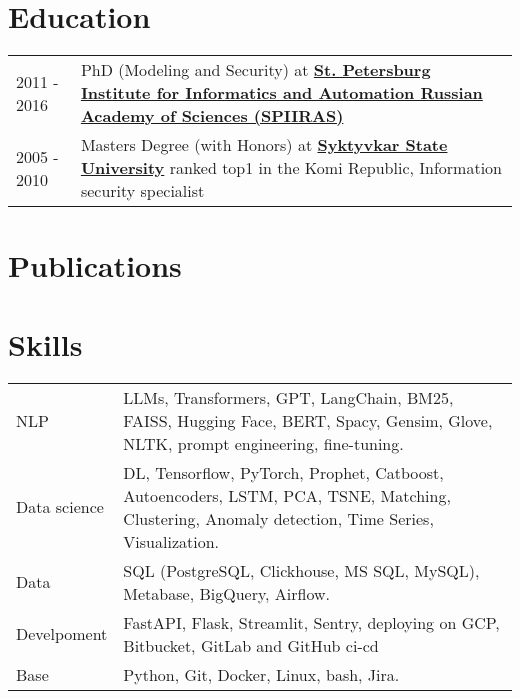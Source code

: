 \documentclass[a4paper,12pt]{article}
\begin{document}
\section{Education}
\begin{tabularx}{\linewidth}{@{}l X@{}}
2011 - 2016 & PhD (Modeling and Security) at \textbf{\href{http://www.spiiras.nw.ru/en/}{St. Petersburg Institute for Informatics and Automation Russian Academy of Sciences (SPIIRAS)}} \\

2005 - 2010 & Masters Degree (with Honors) at \textbf{\href{https://en.syktsu.ru/}{Syktyvkar State University}} ranked top1 in the Komi Republic, Information security specialist \hfill  \\
\end{tabularx}

\section{Publications}

\begin{refsection}
\nocite{nosal2011modeling, nosal2013justification}
\printbibliography[heading=none]
\end{refsection}


\section{Skills}
\begin{tabularx}{\linewidth}{@{}l X@{}}
NLP &  \normalsize{LLMs, Transformers, GPT, LangChain, BM25, FAISS, Hugging Face, BERT, Spacy, Gensim, Glove, NLTK, prompt engineering, fine-tuning.}\\
Data science  &  \normalsize{DL, Tensorflow, PyTorch, Prophet, Catboost, Autoencoders, LSTM, PCA, TSNE, Matching, Clustering, Anomaly detection, Time Series, Visualization.}\\
Data &  \normalsize{SQL (PostgreSQL, Clickhouse, MS SQL, MySQL), Metabase, BigQuery, Airflow.}\\
Develpoment &  \normalsize{FastAPI, Flask, Streamlit, Sentry, deploying on GCP, Bitbucket, GitLab and GitHub ci-cd} \\
Base &  \normalsize{Python, Git, Docker, Linux, bash, Jira.}
\end{tabularx}

\vfill
{}
\end{document}
